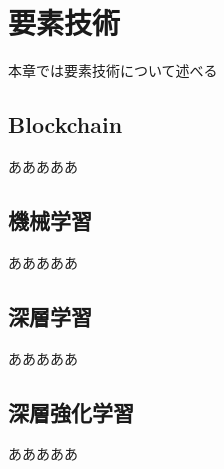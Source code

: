 \chapter{要素技術}
\label{technical_background}

本章では要素技術について述べる

\section{Blockchain}

あああああ

\section{機械学習}

あああああ

\section{深層学習}

あああああ

\section{深層強化学習}

あああああ

\section{}




